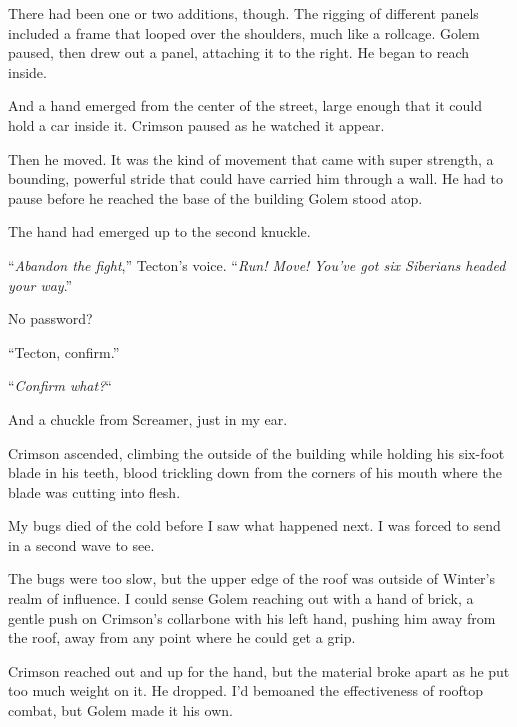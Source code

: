 There had been one or two additions, though.  The rigging of different panels included a frame that looped over the shoulders, much like a rollcage.  Golem paused, then drew out a panel, attaching it to the right.  He began to reach inside.



And a hand emerged from the center of the street, large enough that it could hold a car inside it.  Crimson paused as he watched it appear.



Then he moved.  It was the kind of movement that came with super strength, a bounding, powerful stride that could have carried him through a wall.  He had to pause before he reached the base of the building Golem stood atop.



The hand had emerged up to the second knuckle.



``\emph{Abandon the fight},'' Tecton's voice.  ``\emph{Run!  Move!  }\emph{You've got six Siberians headed your way}.''



No password?



``Tecton, confirm.''



``\emph{Confirm what?}``



And a chuckle from Screamer, just in my ear.



Crimson ascended, climbing the outside of the building while holding his six-foot blade in his teeth, blood trickling down from the corners of his mouth where the blade was cutting into flesh.



My bugs died of the cold before I saw what happened next.  I was forced to send in a second wave to see.



The bugs were too slow, but the upper edge of the roof was outside of Winter's realm of influence.  I could sense Golem reaching out with a hand of brick, a gentle push on Crimson's collarbone with his left hand, pushing him away from the roof, away from any point where he could get a grip.



Crimson reached out and up for the hand, but the material broke apart as he put too much weight on it.  He dropped.  I'd bemoaned the effectiveness of rooftop combat, but Golem made it his own.



